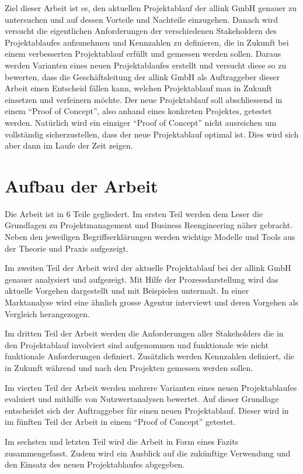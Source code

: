 Ziel dieser Arbeit ist es, den aktuellen Projektablauf der
allink GmbH genauer zu untersuchen und auf dessen Vorteile und Nachteile einzugehen.
Danach wird versucht die eigentlichen Anforderungen der verschiedenen Stakeholdern
des Projektablaufes aufzunehmen und Kennzahlen zu definieren, die in Zukunft
bei einem verbesserten Projektablauf erfüllt und gemessen werden sollen.
Daraus werden Varianten eines neuen Projektablaufes erstellt und versucht 
diese so zu bewerten, dass die Geschäftsleitung der allink GmbH als Auftraggeber 
dieser Arbeit einen
Entscheid fällen kann, welchen Projektablauf man in Zukunft einsetzen und 
verfeinern möchte. Der neue Projektablauf soll abschliessend in einem ``Proof of Concept'', also
anhand eines konkreten Projektes, getestet werden. Natürlich wird ein einziger
``Proof of Concept'' nicht ausreichen um vollständig sicherzustellen, dass der
neue Projektablauf optimal ist. Dies wird sich aber dann im Laufe der Zeit zeigen.

\section{Aufbau der Arbeit}
Die Arbeit ist in 6 Teile gegliedert. Im ersten Teil werden dem Leser die
Grundlagen zu Projektmanagement und Business Reengineering näher gebracht. Neben
den jeweiligen Begriffserklärungen werden wichtige Modelle und Tools aus der
Theorie und Praxis aufgezeigt.

Im zweiten Teil der Arbeit wird der aktuelle Projektablauf bei der allink
GmbH genauer analysiert und aufgezeigt. Mit Hilfe der Prozessdarstellung wird
das aktuelle Vorgehen dargestellt und mit Beispielen untermalt. In einer
Marktanalyse wird eine ähnlich grosse Agentur interviewt und deren Vorgehen
als Vergleich herangezogen.

Im dritten Teil der Arbeit werden die Anforderungen aller Stakeholders die in
den Projektablauf involviert sind aufgenommen und funktionale wie nicht funktionale
Anforderungen definiert. Zusätzlich werden Kennzahlen definiert, die in Zukunft
während und nach den Projekten gemessen werden sollen.

Im vierten Teil der Arbeit werden mehrere Varianten eines neuen Projektablaufes
evaluiert und mithilfe von Nutzwertanalysen bewertet. Auf dieser Grundlage
entscheidet sich der Auftraggeber für einen neuen Projektablauf. Dieser wird in 
im fünften Teil der Arbeit in einem ``Proof of Concept'' getestet.

Im sechsten und letzten Teil wird die Arbeit in Form eines Fazits zusammengefasst.
Zudem wird ein Ausblick auf die zukünftige Verwendung und den Einsatz des neuen
Projektablaufes abgegeben.

